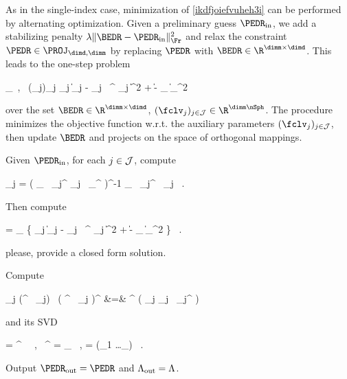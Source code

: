As in the single-index case, minimization of \eqref{ikdfjoiefvuheh3i} can be performed 
by alternating optimization.
Given a preliminary guess \( \PEDR_{\init} \), we add a stabilizing penalty 
\( \lambda \| \BEDR - \PEDR_{\init} \|_{\Fr}^{2} \) 
and relax the constraint \( \PEDR \in \PROJ_{\dimd,\dimm} \) by 
replacing \( \PEDR \) with \( \BEDR \in \R^{\dimm \times \dimd} \).
This leads to the one-step problem
%
\begin{EQA}[c]
	\inf_{\BEDR \, , \, (\fclv_{j})_{j \in \JJJ} }
	\sum_{j \in \JJJ}  
	\bigl\| \Imav_{j} - \UV_{j} \, \BEDR^{\T} \fclv_{j} \bigr\|^{2}
	+ \lambda \| \BEDR - \PEDR_{\init} \|_{\Fr}^{2}
	\, 
\label{ikdfjoiefjoieuAVEmi}
\end{EQA}
over the set \( \BEDR \in \R^{\dimm \times \dimd} \), \( (\fclv_{j})_{j \in \JJJ} \in \R^{\dimm \nSph} \).
The procedure minimizes the objective function w.r.t. the auxiliary parameters 
\(  (\fclv_{j})_{j \in \JJJ}\), then update \( \BEDR \) and projects on the space of 
orthogonal mappings.

\begin{mylist}
\item
Given \( \PEDR_{\init} \), for each \( j \in \mathcal{J} \), compute
\begin{EQA}[c]
	\hat{\fclv}_{j}
	=
	\bigl( \PEDR_{\init} \, \UV_{j}^{\T} \UV_{j} \, \PEDR_{\init}^{\T} \bigr)^{-1} \PEDR_{\init} \, \UV_{j}^{\T} \, \Imav_{j}
	\, .
\end{EQA}

\item
Then compute
\begin{EQA}[c]
	\hat{\BEDR}
	=
	\arginf_{\BEDR} \biggl\{ \sum_{j \in \JJJ}  
	\bigl\| \Imav_{j} - \UV_{j} \, \BEDR^{\T} \hat{\fclv}_{j} \bigr\|^{2}
	+ \lambda \| \BEDR - \PEDR_{\init} \|_{\Fr}^{2} \biggr\}
	\, .
\end{EQA}
{\color{blue} please, provide a closed form solution}.
\item 
Compute
\begin{EQA}[rcl]
	\JEDR
	\eqdef
	\sum_{j \in \JJJ} (\hat{\BEDR}^{\T} \, \hat{\fclv}_{j}) \, \bigl( \hat{\BEDR}^{\T} \, \hat{\fclv}_{j} \bigr)^{\T}
	&=&
	\hat{\BEDR}^{\T} \Bigl( \sum_{j \in \JJJ} \hat{\fclv}_{j} \, \hat{\fclv}_{j}^{\T} \Bigr) \hat{\BEDR}
	\, 
\end{EQA}
and its SVD
\begin{EQA}[c]
	\JEDR
	=
	\PEDR^{\T} \Lambda \, \PEDR
	\, ,
	\qquad
	\PEDR \, \PEDR^{\T}
	= 
	\Id_{\dimm}
	\, ,
	\quad
	\Lambda = \diag(\lambda_{1} \geq \ldots \geq \lambda_{\dimm})
	\, .
\end{EQA}

\item 
Output \( \PEDR_{\outp} = \PEDR \) and \( \Lambda_{\operatorname{out}} = \Lambda \).
\end{mylist}

